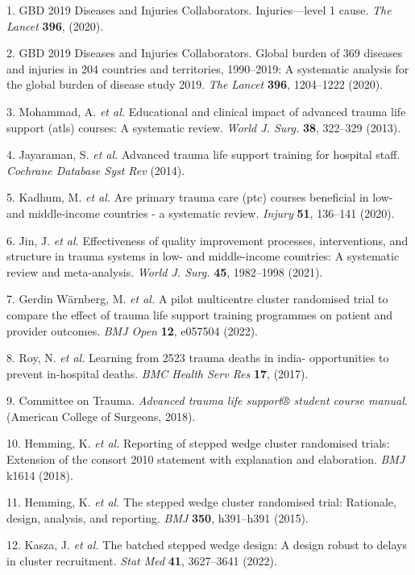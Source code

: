 \documentclass[
  11pt,
]{article}
\newenvironment{cslreferences}%
  {}%
  {\par}
\begin{document}
\hypertarget{refs}{}
\begin{cslreferences}
\leavevmode\hypertarget{ref-injuries2020}{}%
1. GBD 2019 Diseases and Injuries Collaborators. Injuries---level 1 cause. \emph{The Lancet} \textbf{396}, (2020).

\leavevmode\hypertarget{ref-GBD2020}{}%
2. GBD 2019 Diseases and Injuries Collaborators. Global burden of 369 diseases and injuries in 204 countries and territories, 1990--2019: A systematic analysis for the global burden of disease study 2019. \emph{The Lancet} \textbf{396}, 1204--1222 (2020).

\leavevmode\hypertarget{ref-Mohammad2013}{}%
3. Mohammad, A. \emph{et al.} Educational and clinical impact of advanced trauma life support (atls) courses: A systematic review. \emph{World J. Surg.} \textbf{38}, 322--329 (2013).

\leavevmode\hypertarget{ref-Jayaraman2014}{}%
4. Jayaraman, S. \emph{et al.} Advanced trauma life support training for hospital staff. \emph{Cochrane Database Syst Rev} (2014).

\leavevmode\hypertarget{ref-Kadhum2020}{}%
5. Kadhum, M. \emph{et al.} Are primary trauma care (ptc) courses beneficial in low- and middle-income countries - a systematic review. \emph{Injury} \textbf{51}, 136--141 (2020).

\leavevmode\hypertarget{ref-Jin2021}{}%
6. Jin, J. \emph{et al.} Effectiveness of quality improvement processes, interventions, and structure in trauma systems in low- and middle-income countries: A systematic review and meta-analysis. \emph{World J. Surg.} \textbf{45}, 1982--1998 (2021).

\leavevmode\hypertarget{ref-GerdinWuxe4rnberg2022}{}%
7. Gerdin Wärnberg, M. \emph{et al.} A pilot multicentre cluster randomised trial to compare the effect of trauma life support training programmes on patient and provider outcomes. \emph{BMJ Open} \textbf{12}, e057504 (2022).

\leavevmode\hypertarget{ref-Roy2017}{}%
8. Roy, N. \emph{et al.} Learning from 2523 trauma deaths in india- opportunities to prevent in-hospital deaths. \emph{BMC Health Serv Res} \textbf{17}, (2017).

\leavevmode\hypertarget{ref-acsAtls2018}{}%
9. Committee on Trauma. \emph{Advanced trauma life support® student course manual}. (American College of Surgeons, 2018).

\leavevmode\hypertarget{ref-Hemming2018}{}%
10. Hemming, K. \emph{et al.} Reporting of stepped wedge cluster randomised trials: Extension of the consort 2010 statement with explanation and elaboration. \emph{BMJ} k1614 (2018).

\leavevmode\hypertarget{ref-Hemming2015}{}%
11. Hemming, K. \emph{et al.} The stepped wedge cluster randomised trial: Rationale, design, analysis, and reporting. \emph{BMJ} \textbf{350}, h391--h391 (2015).

\leavevmode\hypertarget{ref-Kasza2022}{}%
12. Kasza, J. \emph{et al.} The batched stepped wedge design: A design robust to delays in cluster recruitment. \emph{Stat Med} \textbf{41}, 3627--3641 (2022).
\end{cslreferences}
\end{document}
